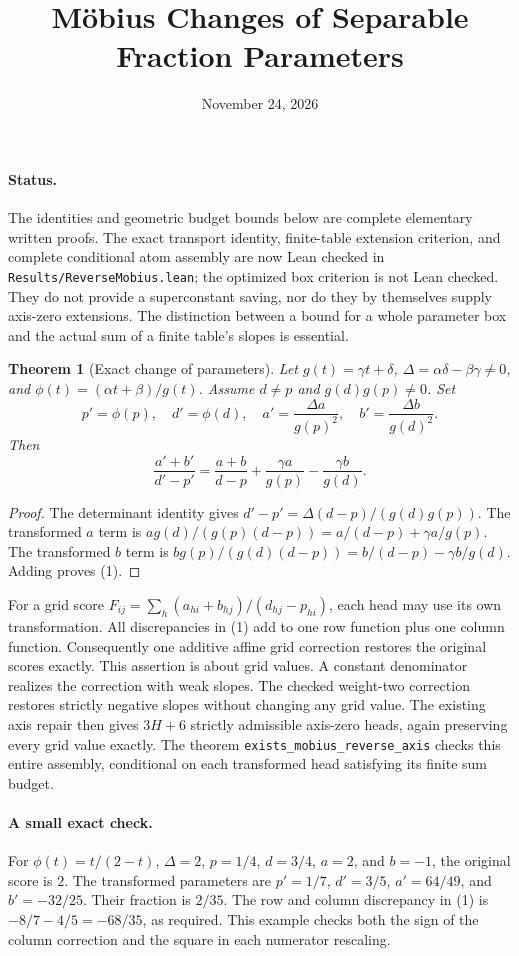 \documentclass[11pt]{article}
\title{M\"obius Changes of Separable Fraction Parameters}
\author{}
\date{November 24, 2026}
\newtheorem{theorem}{Theorem}
\begin{document}
\maketitle

\paragraph{Status.}
The identities and geometric budget bounds below are complete elementary
written proofs. The exact transport identity, finite-table extension
criterion, and complete conditional atom assembly are now Lean checked
in \texttt{Results/ReverseMobius.lean}; the optimized box criterion is
not Lean checked. They do not provide a
superconstant saving, nor do they by themselves supply axis-zero
extensions. The distinction between a bound for a whole parameter box
and the actual sum of a finite table's slopes is essential.

\begin{theorem}[Exact change of parameters]
Let $g(t)=\gamma t+\delta$, $\Delta=\alpha\delta-\beta\gamma\ne0$,
and $\phi(t)=(\alpha t+\beta)/g(t)$. Assume $d\ne p$ and
$g(d)g(p)\ne0$. Set
\[
 p'=\phi(p),\quad d'=\phi(d),\quad
 a'=\frac{\Delta a}{g(p)^2},\quad
 b'=\frac{\Delta b}{g(d)^2}.
\]
Then
\[
 \frac{a'+b'}{d'-p'}
 =\frac{a+b}{d-p}+\frac{\gamma a}{g(p)}
                  -\frac{\gamma b}{g(d)}.                 \tag{1}
\]
\end{theorem}
\begin{proof}
The determinant identity gives
$d'-p'=\Delta(d-p)/(g(d)g(p))$. The transformed $a$ term is
$a g(d)/(g(p)(d-p))=a/(d-p)+\gamma a/g(p)$.
The transformed $b$ term is
$b g(p)/(g(d)(d-p))=b/(d-p)-\gamma b/g(d)$.
Adding proves (1).
\end{proof}
For a grid score $F_{ij}=\sum_h(a_{hi}+b_{hj})/(d_{hj}-p_{hi})$,
each head may use its own transformation. All discrepancies in (1)
add to one row function plus one column function. Consequently one
additive affine grid correction restores the original scores exactly.
This assertion is about grid values. A constant denominator realizes
the correction with weak slopes. The checked weight-two correction
restores strictly negative slopes without changing any grid value.
The existing axis repair then gives $3H+6$ strictly admissible axis-zero
heads, again preserving every grid value exactly. The theorem
\texttt{exists\_mobius\_reverse\_axis} checks this entire assembly,
conditional on each transformed head satisfying its finite sum budget.

\paragraph{A small exact check.}
For $\phi(t)=t/(2-t)$, $\Delta=2$, $p=1/4$, $d=3/4$, $a=2$, and
$b=-1$, the original score is $2$. The transformed parameters are
$p'=1/7$, $d'=3/5$, $a'=64/49$, and $b'=-32/25$. Their fraction is
$2/35$. The row and column discrepancy in (1) is
$-8/7-4/5=-68/35$, as required. This example checks both the sign of
the column correction and the square in each numerator rescaling.
\end{document}
